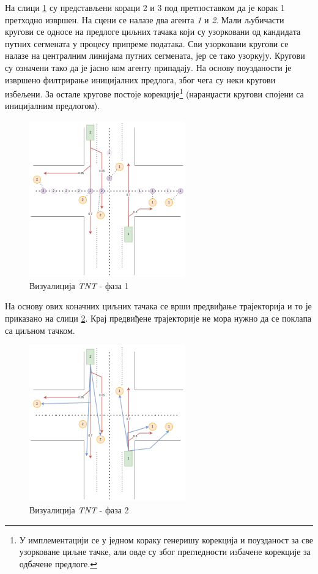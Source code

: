 \documentclass[11pt,oneside]{memoir}
\begin{document}
На слици \ref{tnt-viz-1} су представљени кораци 2 и 3 под претпоставком да је корак 1 претходно извршен. На сцени се налазе два агента
\textit{1} и \textit{2}. Мали љубичасти кругови се односе на предлоге циљних тачака који су узорковани од кандидата путних сегмената у процесу припреме података.
Сви узорковани кругови се налазе на централним линијама путних сегмената, јер се тако узоркују. Кругови су означени тако да је јасно ком агенту припадају. На основу поузданости је 
извршено филтрирање иницијалних предлога, због чега су неки кругови избељени. За остале кругове постоје корекције\footnote{
  У имплементацији се у једном кораку генеришу корекција и поузданост за све узорковане циљне тачке, али овде су због прегледности
  избачене корекције за одбачене предлоге.
} (наранџасти кругови спојени са иницијалним предлогом).


\begin{figure}[H]
  \centering
  \includegraphics[width=0.6\textwidth]{images/tnt-viz-Page-1.drawio.png}
  \caption{Визуалиција \textit{TNT} - фаза 1 \label{tnt-viz-1}}
\end{figure}

На основу ових коначних циљних тачака се врши предвиђање трајекторија и то је приказано на слици \ref{tnt-viz-2}. Крај предвиђене трајекторије не мора
нужно да се поклапа са циљном тачком.

\begin{figure}[H]
  \centering
  \includegraphics[width=0.6\textwidth]{images/tnt-viz-Page-2.drawio.png}
  \caption{Визуалиција \textit{TNT} - фаза 2 \label{tnt-viz-2}}
\end{figure}
\end{document}
